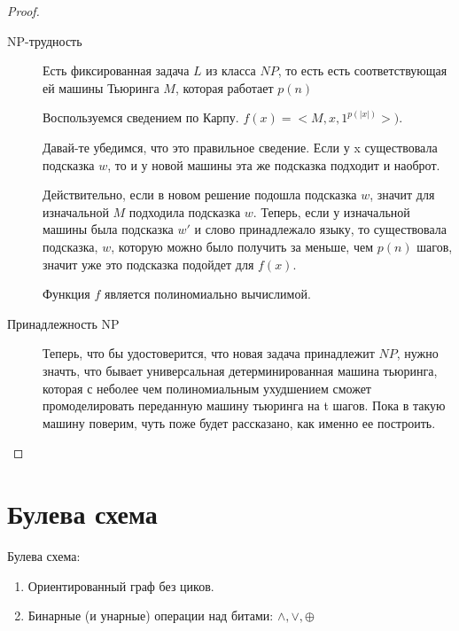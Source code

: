 \begin{proof}
	\begin{description}
	\item[NP-трудность]
	Есть фиксированная задача $L$ из класса $NP$, то есть есть соответствующая ей машины Тьюринга $M$, которая работает $p(n)$
	
	Воспользуемся сведением по Карпу. $f(x) = <M, x, 1^{p(|x|)}>)$.

	Давай-те убедимся, что это правильное сведение. Если у x существовала подсказка $w$, то и у новой машины
	эта же подсказка подходит и наоброт.

        Действительно, если в новом решение подошла подсказка $w$, значит для изначальной $M$ подходила подсказка $w$.
        Теперь, если у изначальной машины была подсказка $w'$ и слово принадлежало языку, то существовала подсказка,
        $w$, которую можно было получить за меньше, чем $p(n)$ шагов, значит уже это подсказка подойдет для $f(x)$.

        Функция $f$ является полиномиально вычислимой.
          
	\item[Принадлежность NP]
	Теперь, что бы удостоверится, что новая задача принадлежит $NP$, нужно значть, что 
	бывает универсальная детерминированная машина тьюринга, которая с неболее чем полиномиальным ухудшением 
	сможет промоделировать переданную машину тьюринга на t шагов. Пока в такую машину поверим, чуть поже будет рассказано,
	как именно ее построить.  
	\end{description}
\end{proof}

\section{Булева схема}
\begin{Def}
Булева схема:
\begin{enumerate}
\item Ориентированный граф без циков.
\item Бинарные (и унарные) операции над битами: $\wedge, \vee, \oplus$
\end{enumerate} 
\end{Def}
\begin{exmp}

\end{exmp}

